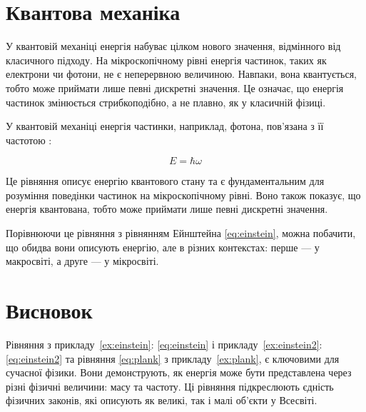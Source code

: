 \documentclass[a4paper]{article}
\begin{document}
\section{Квантова механіка}


У квантовій механіці енергія набуває цілком нового значення, відмінного від класичного підходу. На
мікроскопічному рівні енергія частинок, таких як електрони чи фотони, не є неперервною величиною.
Навпаки, вона квантується, тобто може приймати лише певні дискретні значення. Це означає, що енергія
частинок змінюється стрибкоподібно, а не плавно, як у класичній фізиці.

\begin{Example}\label{ex:plank}
	У квантовій механіці енергія частинки, наприклад, фотона, пов'язана з її частотою :

	\begin{equation}\label{eq:plank}
		E = \hbar\omega
	\end{equation}

	Це рівняння описує енергію квантового стану та є фундаментальним для розуміння поведінки
	частинок на мікроскопічному рівні. Воно також показує, що енергія квантована, тобто може
	приймати лише певні дискретні значення.

	Порівнюючи це рівняння з рівнянням Ейнштейна \eqref{eq:einstein}, можна побачити, що обидва
	вони описують енергію, але в різних контекстах: перше — у макросвіті, а друге — у мікросвіті.
\end{Example}

\section{Висновок}

Рівняння з прикладу~\ref{ex:einstein}: \eqref{eq:einstein} і прикладу~\ref{ex:einstein2}:
\eqref{eq:einstein2} та рівняння \ref{eq:plank} з
прикладу~\ref{ex:plank}, є ключовими для сучасної фізики. Вони
демонструють, як енергія може бути представлена через різні фізичні величини: масу та частоту.
Ці рівняння підкреслюють єдність фізичних законів, які описують як великі, так і малі об'єкти у
Всесвіті.
\end{document}
